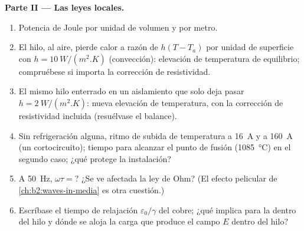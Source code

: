 \begin{problem}
\medskip
\noindent\textbf{Parte II --- Las leyes locales.}
\begin{enumerate}[resume]
  \item Potencia de Joule por unidad de volumen y por metro.
  \item El hilo, al aire, pierde calor a razón de $h(T - T_a)$ por unidad
        de superficie con $h = \qty{10}{W/(m^2.K)}$ (convección): elevación
        de temperatura de equilibrio; compruébese si importa la corrección
        de resistividad.
  \item El mismo hilo enterrado en un aislamiento que solo deja pasar $h =
        \qty{2}{W/(m^2.K)}$: nueva elevación de temperatura, con la
        corrección de resistividad incluida (resuélvase el balance).
  \item Sin refrigeración alguna, ritmo de subida de temperatura a
        \qty{16}{A} y a \qty{160}{A} (un cortocircuito); tiempo para
        alcanzar el punto de fusión (\qty{1085}{\degreeCelsius}) en el
        segundo caso; ¿qué protege la instalación?
  \item A \qty{50}{Hz}, $\omega\tau = ?$ ¿Se ve afectada la ley de Ohm? (El
        efecto pelicular de \cref{ch:b2:waves-in-media} es otra cuestión.)
  \item Escríbase el tiempo de relajación $\varepsilon_0/\gamma$ del cobre; ¿qué
        implica para la  dentro del hilo y dónde se aloja
        la carga que produce el campo $E$ dentro del hilo?
\end{enumerate}


\end{problem}
